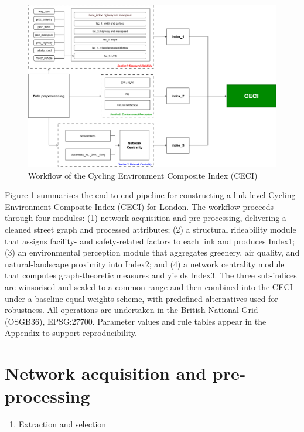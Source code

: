 \documentclass[
  12pt,
  oneside]{book}
\providecommand{\tightlist}{%
  \setlength{\itemsep}{0pt}\setlength{\parskip}{0pt}}
\begin{document}
\begin{figure}

{\centering \includegraphics[width=1\linewidth]{general_images/flow} 

}

\caption{Workflow of the Cycling Environment Composite Index (CECI)}\label{fig:flow}
\end{figure}

Figure \ref{fig:flow} summarises the end-to-end pipeline for constructing a link-level Cycling Environment Composite Index (CECI) for London. The workflow proceeds through four modules: (1) network acquisition and pre-processing, delivering a cleaned street graph and processed attributes; (2) a structural rideability module that assigns facility- and safety-related factors to each link and produces Index1; (3) an environmental perception module that aggregates greenery, air quality, and natural-landscape proximity into Index2; and (4) a network centrality module that computes graph-theoretic measures and yields Index3. The three sub-indices are winsorised and scaled to a common range and then combined into the CECI under a baseline equal-weights scheme, with predefined alternatives used for robustness. All operations are undertaken in the British National Grid (OSGB36), EPSG:27700. Parameter values and rule tables appear in the Appendix to support reproducibility.

\section{Network acquisition and pre-processing}\label{network-acquisition-and-pre-processing}

\begin{enumerate}
\def\labelenumi{\arabic{enumi}.}
\tightlist
\item
  Extraction and selection
\end{enumerate}
\end{document}
